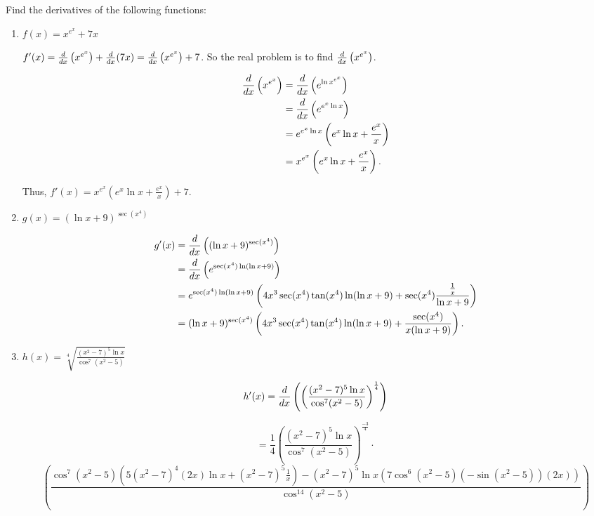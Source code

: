 \documentclass[nooutcomes]{ximera}
\begin{document}
\begin{problem}
Find the derivatives of the following functions:
	\begin{enumerate}
	
	\item  $f(x) = x^{e^x} + 7x$
		\begin{freeResponse}
		$f'(x) = \frac{d}{dx} \left(x^{e^x} \right) + \frac{d}{dx}(7x) = \frac{d}{dx} \left(x^{e^x} \right) + 7$.  So the real problem is to find $\frac{d}{dx} \left(x^{e^x} \right)$.  
		
		\begin{align*}
		\frac{d}{dx} \left( x^{e^x} \right) &= \frac{d}{dx} \left( e^{\ln x^{e^x}} \right) \\
		&= \frac{d}{dx} \left( e^{e^x \ln x} \right) \\
		&= e^{e^x \ln x} \left( e^x \ln x + \frac{e^x}{x} \right) \\
		&= x^{e^x} \left( e^x \ln x + \frac{e^x}{x} \right).
		\end{align*}
		
		Thus, $f'(x) = x^{e^x} \left( e^x \ln x + \frac{e^x}{x} \right) + 7$.  
		
		\end{freeResponse}
		
		
		
	\item  $g(x) = (\ln x + 9)^{\sec(x^4)}$
		\begin{freeResponse}
			\begin{align*}
			g'(x) &= \frac{d}{dx} \left( (\ln x + 9)^{\sec(x^4)} \right) \\
			&= \frac{d}{dx} \left( e^{\sec(x^4) \ln ( \ln x + 9) } \right) \\
			&= e^{\sec(x^4) \ln ( \ln x + 9)} \left( 4x^3 \sec(x^4) \tan(x^4) \ln(\ln x + 9) + \sec(x^4) \frac{\frac{1}{x}}{\ln x + 9} \right) \\
			&= (\ln x + 9)^{\sec(x^4)} \left( 4x^3 \sec(x^4) \tan(x^4) \ln(\ln x + 9) + \frac{\sec(x^4)}{x(\ln x + 9)} \right) .
			\end{align*}
		\end{freeResponse}
		
		
		
	\item  $h(x) = \sqrt[4]{\frac{(x^2 - 7)^5 \ln x}{\cos^7(x^2 - 5)}}$
		\begin{freeResponse}
		$$h'(x) = \frac{d}{dx} \left( \left( \frac{(x^2 - 7)^5 \ln x}{\cos^7(x^2 - 5)} \right)^{\frac{1}{4}} \right) $$
		
		$$=  \frac{1}{4} \left( \frac{(x^2 - 7)^5 \ln x}{\cos^7(x^2 - 5)} \right)^{\frac{-3}{4}} \cdot $$
		$$\left( \frac{\cos^7(x^2 - 5)(5(x^2-7)^4(2x) \ln x + (x^2-7)^5 \frac{1}{x}) - (x^2-7)^5 \ln x (7\cos^6(x^2-5) (-\sin(x^2 - 5))(2x))}{\cos^{14}(x^2 - 5)} \right)$$
		\end{freeResponse}
		
		
		
	\end{enumerate}
		
		
\end{problem}
\end{document}
